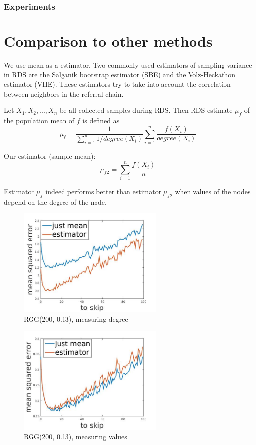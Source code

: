 \documentclass[12pt]{report}
\begin{document}
\subsection{Experiments}

\chapter{Comparison to other methods}

We use mean as a estimator.
Two commonly used estimators of sampling variance in RDS are the Salganik bootstrap estimator (SBE) and the Volz-Heckathon estimator (VHE). These estimators try to take into account the correlation between neighbors in the referral chain.


Let $X_1, X_2, ..., X_n$ be all collected samples during RDS.
Then RDS estimate $\mu_f$ of the population mean of $f$ is defined \cite{goel2010assessing} as
$$\mu_f = \frac{1}{\sum\limits_{i=1}^n 1/degree(X_i)} \sum\limits_{i=1}^n \frac{f(X_i)}{degree(X_i)}$$


Our estimator (sample mean):
$$\mu_{f2} = \sum\limits_{i=1}^n \frac{f(X_i)}{n}$$

Estimator $\mu_f$ indeed performs better than estimator $\mu_{f2}$ when values of the nodes depend on the degree of the node.


\begin{figure}[h]
    \centering
    \includegraphics[height=200px]{RGGdegree}
    \caption{ RGG(200, 0.13), measuring degree}
\end{figure}


\begin{figure}[h]
    \centering
    \includegraphics[height=200px]{RGGfield}
    \caption{ RGG(200, 0.13), measuring values }
\end{figure}
\end{document}
